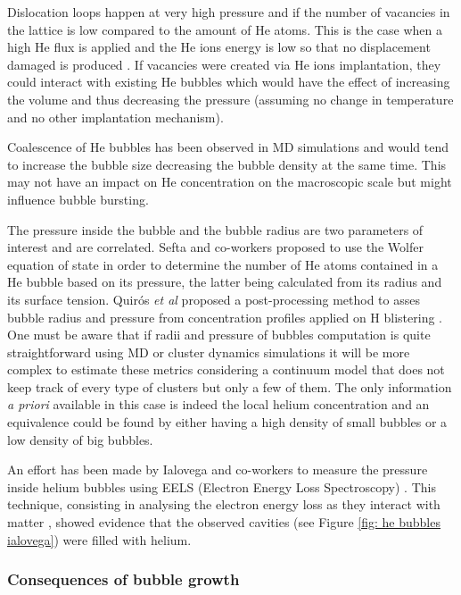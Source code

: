 Dislocation loops happen at very high pressure and if the number of vacancies in the lattice is low compared to the amount of He atoms.
This is the case when a high He flux is applied and the He ions energy is low so that no displacement damaged is produced .
If vacancies were created via He ions implantation, they could interact with existing He bubbles which would have the effect of increasing the volume and thus decreasing the pressure (assuming no change in temperature and no other implantation mechanism).

Coalescence of He bubbles has been observed in MD simulations  and would tend to increase the bubble size decreasing the bubble density at the same time.
This may not have an impact on He concentration on the macroscopic scale but might influence bubble bursting.

The pressure inside the bubble and the bubble radius are two parameters of interest and are correlated.
Sefta and co-workers  proposed to use the Wolfer equation of state in order to determine the number of He atoms contained in a He bubble based on its pressure, the latter being calculated from its radius and its surface tension.
Quir\'os \textit{et al} proposed a post-processing method to asses bubble radius and pressure from concentration profiles applied on H blistering .
One must be aware that if radii and pressure of bubbles computation is quite straightforward using MD  or cluster dynamics  simulations it will be more complex to estimate these metrics considering a continuum model that does not keep track of every type of clusters but only a few of them.
The only information \textit{a priori} available in this case is indeed the local helium concentration and an equivalence could be found by either having a high density of small bubbles or a low density of big bubbles.

An effort has been made by Ialovega and co-workers to measure the pressure inside helium bubbles using EELS (Electron Energy Loss Spectroscopy) .
This technique, consisting in analysing the electron energy loss as they interact with matter , showed evidence that the observed cavities (see Figure \ref{fig: he bubbles ialovega}) were filled with helium.

\subsubsection{Consequences of bubble growth}

